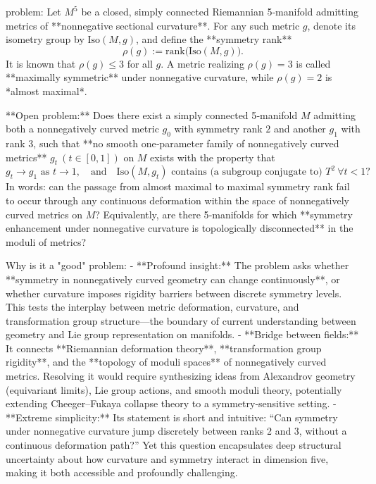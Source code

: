 problem:  
Let \( M^5 \) be a closed, simply connected Riemannian 5‑manifold admitting metrics of **nonnegative sectional curvature**.  
For any such metric \( g \), denote its isometry group by \( \mathrm{Iso}(M,g) \), and define the **symmetry rank**  
\[
\rho(g) := \mathrm{rank}\!\big(\mathrm{Iso}(M,g)\big).
\]  
It is known that \( \rho(g)\le3 \) for all \(g\).  A metric realizing \( \rho(g)=3 \) is called **maximally symmetric** under nonnegative curvature, while \( \rho(g)=2 \) is *almost maximal*.  

**Open problem:**  
Does there exist a simply connected 5‑manifold \(M\) admitting both a nonnegatively curved metric \( g_0 \) with symmetry rank \(2\) and another \( g_1 \) with rank \(3\), such that **no smooth one‑parameter family of nonnegatively curved metrics** \( g_t\ (t\in[0,1]) \) on \(M\) exists with the property that  
\[
g_t\to g_1 \text{ as } t\to 1,\quad \text{and} \quad \mathrm{Iso}(M,g_t)
\text{ contains (a subgroup conjugate to) }T^2 \ \forall t<1?
\]  
In words: can the passage from almost maximal to maximal symmetry rank fail to occur through any continuous deformation within the space of nonnegatively curved metrics on \(M\)?  
Equivalently, are there 5‑manifolds for which **symmetry enhancement under nonnegative curvature is topologically disconnected** in the moduli of metrics?

Why is it a "good" problem:  
- **Profound insight:** The problem asks whether **symmetry in nonnegatively curved geometry can change continuously**, or whether curvature imposes rigidity barriers between discrete symmetry levels.  This tests the interplay between metric deformation, curvature, and transformation group structure—the boundary of current understanding between geometry and Lie group representation on manifolds.  
- **Bridge between fields:** It connects **Riemannian deformation theory**, **transformation group rigidity**, and the **topology of moduli spaces** of nonnegatively curved metrics.  Resolving it would require synthesizing ideas from Alexandrov geometry (equivariant limits), Lie group actions, and smooth moduli theory, potentially extending Cheeger–Fukaya collapse theory to a symmetry‑sensitive setting.  
- **Extreme simplicity:**  Its statement is short and intuitive:  
  “Can symmetry under nonnegative curvature jump discretely between ranks 2 and 3, without a continuous deformation path?”  
  Yet this question encapsulates deep structural uncertainty about how curvature and symmetry interact in dimension five, making it both accessible and profoundly challenging.